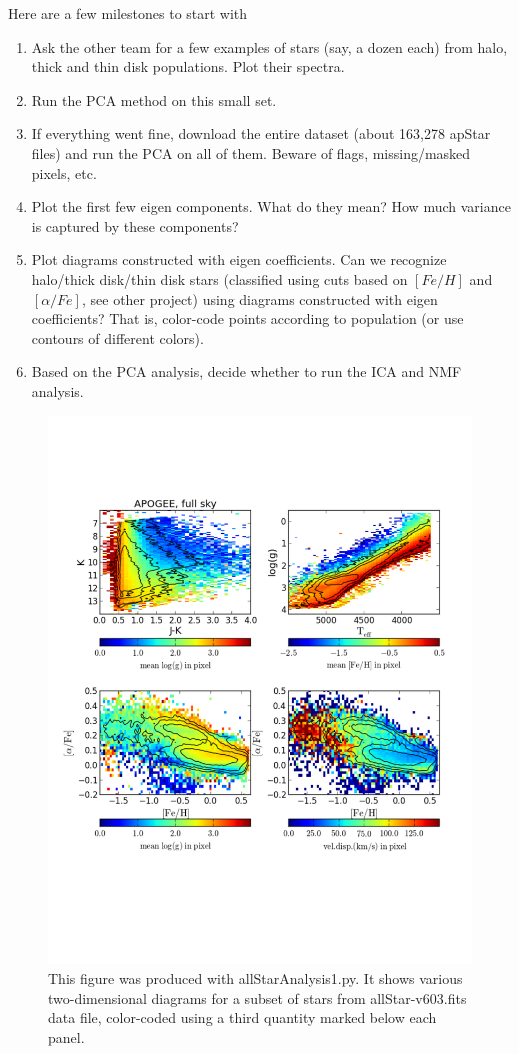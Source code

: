 \documentclass[12pt,preprint]{aastex}
\begin{document}
Here are a few milestones to start with
\begin{enumerate}
\item Ask the other team for a few examples of stars (say, a dozen each) from halo, thick and thin disk populations.
Plot their spectra. 
\item Run the PCA method on this small set.
\item If everything went fine, download the entire dataset (about 163,278 apStar files) and run the PCA on 
all of them. Beware of flags, missing/masked pixels, etc. 
\item Plot the first few eigen components. What do they mean? How much variance is captured by these
components?
\item Plot diagrams constructed with eigen coefficients. Can we
recognize halo/thick disk/thin disk stars (classified using cuts based on $[Fe/H]$ and $[\alpha/Fe]$, see
other project) using diagrams constructed with eigen coefficients? That is, color-code points according 
to population (or use contours of different colors). 
\item Based on the PCA analysis, decide whether to run the ICA and NMF analysis. 
\end{enumerate} 


\begin{figure}
  \centering
  \includegraphics[width=\textwidth]{apogee1.pdf}
  \vskip -1.5in
  \caption{
    This figure was produced with allStarAnalysis1.py. It shows various two-dimensional diagrams  
    for a subset of stars from allStar-v603.fits data file, color-coded using a third quantity marked
    below each panel. 
  }
  \label{basic_example1}
\end{figure}
\end{document}
